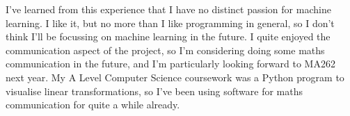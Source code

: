 \documentclass[a4paper]{article}
\begin{document}
I've learned from this experience that I have no distinct passion for machine learning. I like it, but no more than I like programming in general, so I don't think I'll be focussing on machine learning in the future. I quite enjoyed the communication aspect of the project, so I'm considering doing some maths communication in the future, and I'm particularly looking forward to MA262 next year. My A Level Computer Science coursework was a Python program to visualise linear transformations, so I've been using software for maths communication for quite a while already.
\end{document}
